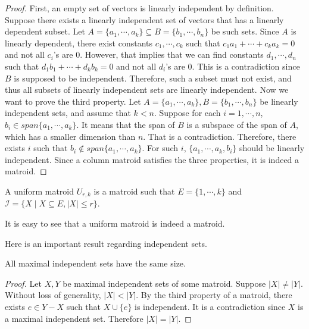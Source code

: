 \begin{proof}
First, an empty set of vectors is linearly independent by definition.
Suppose there exists a linearly independent set of vectors that has a linearly dependent subset.
Let $A = \{a_1, \cdots, a_k\} \subseteq B = \{b_1, \cdots, b_n\}$ be such sets.
Since $A$ is linearly dependent, there exist constants $c_1, \cdots, c_k$ such that $c_1 a_1 + \cdots + c_k a_k = 0$ and not all $c_i$'s are $0$.
However, that implies that we can find constants $d_1, \cdots, d_n$ such that $d_1 b_1 + \cdots + d_k b_k = 0$ and not all $d_i$'s are $0$.
This is a contradiction since $B$ is supposed to be independent.
Therefore, such a subset must not exist, and thus all subsets of linearly independent sets are linearly independent.
Now we want to prove the third property.
Let $A = \{a_1, \cdots, a_k\}, B = \{b_1, \cdots, b_n\}$ be linearly independent sets, and assume that $k < n$.
Suppose for each $i = 1, \cdots, n$, $b_i \in span\{ a_1, \cdots, a_k \}$.
It means that the span of $B$ is a subspace of the span of $A$, which has a smaller dimension than $n$.
That is a contradiction.
Therefore, there exists $i$ such that $b_i \notin span \{ a_1, \cdots, a_k \}$.
For such $i$, $\{ a_1, \cdots, a_k, b_i \}$ should be linearly independent.
Since a column matroid satisfies the three properties, it is indeed a matroid.
\end{proof}


\begin{defn}
A uniform matroid $U_{r, k}$ is a matroid such that $E = \{ 1, \cdots, k \}$ and $\mathcal{I} = \{ X \mid  X \subseteq E, \lvert X \rvert \leq r \}$.
\end{defn}

It is easy to see that a uniform matroid is indeed a matroid.


Here is an important result regarding independent sets.

\begin{thm}
All maximal independent sets have the same size.
\end{thm}

\begin{proof}
Let $X, Y$ be maximal independent sets of some matroid.
Suppose $\lvert X \rvert \neq \lvert Y \rvert$.
Without loss of generality, $\lvert X \rvert < \lvert Y \rvert$.
By the third property of a matroid, there exists $e \in Y - X$ such that $X \cup \{ e \}$ is independent.
It is a contradiction since $X$ is a maximal independent set.
Therefore $\lvert X \rvert = \lvert Y \rvert$.
\end{proof}

